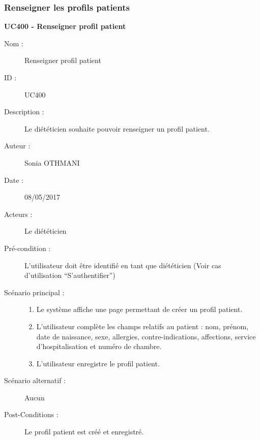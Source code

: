 \subsubsection{Renseigner les profils patients}


\textbf{UC400 - Renseigner profil patient}
\begin{description}
\item [Nom :] Renseigner profil patient
\item [ID :] UC400
\item [Description :] Le diététicien souhaite pouvoir renseigner un profil patient.
\item [Auteur :] Sonia OTHMANI
\item [Date :] 08/05/2017
\item [Acteurs :] Le diététicien
\item [Pré-condition :] L’utilisateur doit être identifié en tant que diététicien (Voir cas d’utilisation \enquote{S’authentifier})
\item [Scénario principal :]
  \begin{enumerate}
  \item Le système affiche une page permettant de créer un profil patient.
  \item L’utilisateur complète les champs relatifs au patient : nom, prénom, date de naissance, sexe, allergies, contre-indications, affections, service d'hospitalisation et numéro de chambre.
  \item L’utilisateur enregistre le profil patient.
 
  \end{enumerate}
\item [Scénario alternatif :] Aucun
\item [Post-Conditions :] Le profil patient est créé et enregistré.
\end{description}

